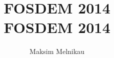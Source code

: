\documentclass[aspectratio=169]{beamer}
\begin{document}
\title{FOSDEM 2014}
\author{Maksim Melnikau}
\date{}

{
\title{
    \\
    {\huge FOSDEM 2014}
    \\
}

\begin{frame}[plain]{}
    \titlepage
\end{frame}
}


{
\begin{frame}[plain]{}
\end{frame}
}
\end{document}
